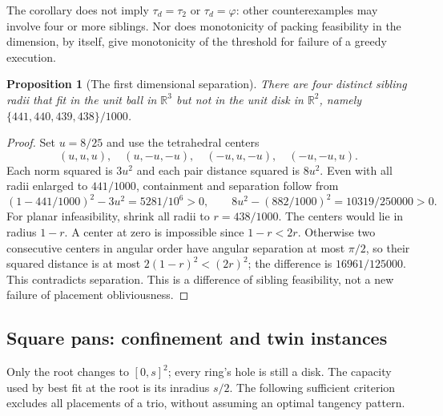 \documentclass[11pt]{article}
\newtheorem{proposition}[theorem]{Proposition}
\theoremstyle{definition}
\newcommand{\R}{\mathbb{R}}
\begin{document}
The corollary does not imply $\tau_d=\tau_2$ or $\tau_d=\varphi$:
other counterexamples may involve four or more siblings. Nor does
monotonicity of packing feasibility in the dimension, by itself,
give monotonicity of the threshold for failure of a greedy execution.

\begin{proposition}[The first dimensional separation]\label{prop:dimfour}
There are four distinct sibling radii that fit in the unit ball
in $\R^3$ but not in the unit disk in $\R^2$, namely
$\{441,440,439,438\}/1000$.
\end{proposition}
\begin{proof}
Set $u=8/25$ and use the tetrahedral centers
\[
(u,u,u),\quad(u,-u,-u),\quad(-u,u,-u),\quad(-u,-u,u).
\]
Each norm squared is
$3u^2$ and each pair distance squared is $8u^2$. Even with all
radii enlarged to $441/1000$, containment and separation follow from
\[
 (1-441/1000)^2-3u^2=5281/10^6>0,\qquad
 8u^2-(882/1000)^2=10319/250000>0.
\]
For planar infeasibility, shrink all radii to $r=438/1000$.
The centers would lie in radius $1-r$. A center at zero is impossible
since $1-r<2r$. Otherwise two consecutive centers in angular order
have angular separation at most $\pi/2$, so their squared distance
is at most $2(1-r)^2<(2r)^2$; the difference is $16961/125000$.
This contradicts separation. This is a difference of sibling
feasibility, not a new failure of placement obliviousness.
\end{proof}

\subsection{Square pans: confinement and twin instances}\label{sec:square}

Only the root changes to $[0,s]^2$; every ring's hole is still a disk.
The capacity used by best fit at the root is its inradius $s/2$.
The following sufficient criterion excludes all placements of a trio,
without assuming an optimal tangency pattern.
\end{document}
